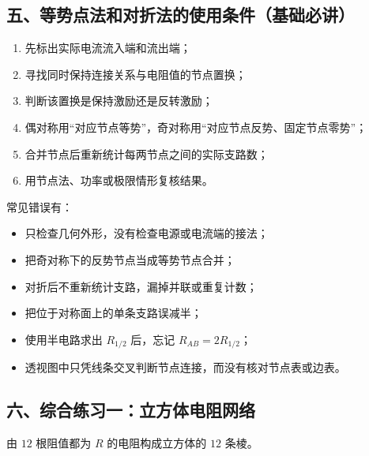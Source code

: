 \subsection{五、等势点法和对折法的使用条件（基础必讲）}\label{m4:ux4e94ux7b49ux52bfux70b9ux6cd5ux548cux5bf9ux6298ux6cd5ux7684ux4f7fux7528ux6761ux4ef6ux57faux7840ux5fc5ux8bb2}

\begin{enumerate}
\def\labelenumi{\arabic{enumi}.}
\tightlist
\item
  先标出实际电流流入端和流出端；
\item
  寻找同时保持连接关系与电阻值的节点置换；
\item
  判断该置换是保持激励还是反转激励；
\item
  偶对称用``对应节点等势''，奇对称用``对应节点反势、固定节点零势''；
\item
  合并节点后重新统计每两节点之间的实际支路数；
\item
  用节点法、功率或极限情形复核结果。
\end{enumerate}

常见错误有：

\begin{itemize}
\tightlist
\item
  只检查几何外形，没有检查电源或电流端的接法；
\item
  把奇对称下的反势节点当成等势节点合并；
\item
  对折后不重新统计支路，漏掉并联或重复计数；
\item
  把位于对称面上的单条支路误减半；
\item
  使用半电路求出 \(R_{1/2}\) 后，忘记 \(R_{AB}=2R_{1/2}\)；
\item
  透视图中只凭线条交叉判断节点连接，而没有核对节点表或边表。
\end{itemize}

\subsection{六、综合练习一：立方体电阻网络}\label{m4:ux516dux7efcux5408ux7ec3ux4e60ux4e00ux7acbux65b9ux4f53ux7535ux963bux7f51ux7edc}

由 \(12\) 根阻值都为 \(R\) 的电阻构成立方体的 \(12\) 条棱。

